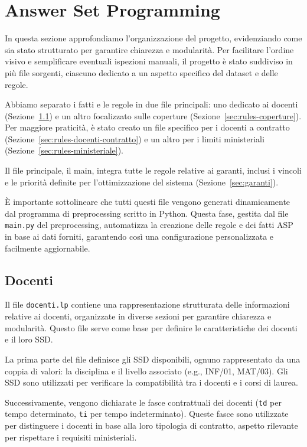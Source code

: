 \section{Answer Set Programming}\label{sec:asp}

In questa sezione approfondiamo l'organizzazione del progetto, evidenziando 
come sia stato strutturato per garantire chiarezza e modularità. 
Per facilitare l'ordine visivo e semplificare eventuali ispezioni manuali, 
il progetto è stato suddiviso in più file sorgenti, ciascuno dedicato a un 
aspetto specifico del dataset e delle regole.

Abbiamo separato i fatti e le regole in due file principali: uno dedicato 
ai docenti (Sezione~\ref*{sec:rules-docenti}) e un altro focalizzato sulle 
coperture (Sezione~\ref*{sec:rules-coperture}). Per maggiore praticità, è 
stato creato un file specifico per i docenti a contratto 
(Sezione~\ref*{sec:rules-docenti-contratto}) e un altro per i limiti 
ministeriali (Sezione~\ref*{sec:rules-ministeriale}).

Il file principale, il main, integra tutte le regole relative ai garanti, 
inclusi i vincoli e le priorità definite per l'ottimizzazione del sistema 
(Sezione~\ref*{sec:garanti}).

È importante sottolineare che tutti questi file vengono generati dinamicamente 
dal programma di preprocessing scritto in Python. Questa fase, gestita dal 
file \texttt{main.py} del preprocessing, automatizza la creazione delle regole 
e dei fatti ASP in base ai dati forniti, garantendo così una configurazione 
personalizzata e facilmente aggiornabile. 


\subsection{Docenti}\label{sec:rules-docenti}
Il file \texttt{docenti.lp} contiene una rappresentazione strutturata delle 
informazioni relative ai docenti, organizzate in diverse sezioni per garantire 
chiarezza e modularità. Questo file serve come base per definire le caratteristiche 
dei docenti e il loro SSD.

La prima parte del file definisce gli SSD disponibili, ognuno rappresentato da una 
coppia di valori: la disciplina e il livello associato (e.g., INF/01, MAT/03). Gli SSD 
sono utilizzati per verificare la compatibilità tra i docenti e i corsi di laurea.

Successivamente, vengono dichiarate le fasce contrattuali dei docenti (\texttt{td} 
per tempo determinato, \texttt{ti} per tempo indeterminato). Queste fasce sono 
utilizzate per distinguere i docenti in base alla loro tipologia di contratto,
aspetto rilevante per rispettare i requisiti ministeriali.

